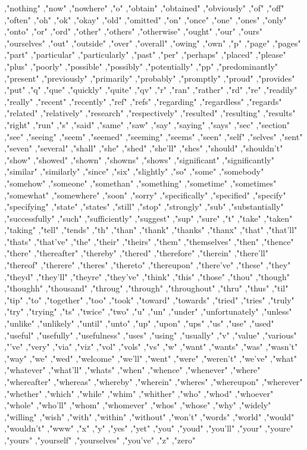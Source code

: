 ,"nothing" ,"now" ,"nowhere" ,"o" ,"obtain" ,"obtained" ,"obviously" ,"of" ,"off" ,"often" ,"oh" ,"ok" ,"okay" ,"old" ,"omitted" ,"on" ,"once" ,"one" ,"ones" ,"only" ,"onto" ,"or" ,"ord" ,"other" ,"others" ,"otherwise" ,"ought" ,"our" ,"ours" ,"ourselves" ,"out" ,"outside" ,"over" ,"overall" ,"owing" ,"own" ,"p" ,"page" ,"pages" ,"part" ,"particular" ,"particularly" ,"past" ,"per" ,"perhaps" ,"placed" ,"please" ,"plus" ,"poorly" ,"possible" ,"possibly" ,"potentially" ,"pp" ,"predominantly" ,"present" ,"previously" ,"primarily" ,"probably" ,"promptly" ,"proud" ,"provides" ,"put" ,"q" ,"que" ,"quickly" ,"quite" ,"qv" ,"r" ,"ran" ,"rather" ,"rd" ,"re" ,"readily" ,"really" ,"recent" ,"recently" ,"ref" ,"refs" ,"regarding" ,"regardless" ,"regards" ,"related" ,"relatively" ,"research" ,"respectively" ,"resulted" ,"resulting" ,"results" ,"right" ,"run" ,"s" ,"said" ,"same" ,"saw" ,"say" ,"saying" ,"says" ,"sec" ,"section" ,"see" ,"seeing" ,"seem" ,"seemed" ,"seeming" ,"seems" ,"seen" ,"self" ,"selves" ,"sent" ,"seven" ,"several" ,"shall" ,"she" ,"shed" ,"she'll" ,"shes" ,"should" ,"shouldn't" ,"show" ,"showed" ,"shown" ,"showns" ,"shows" ,"significant" ,"significantly" ,"similar" ,"similarly" ,"since" ,"six" ,"slightly" ,"so" ,"some" ,"somebody" ,"somehow" ,"someone" ,"somethan" ,"something" ,"sometime" ,"sometimes" ,"somewhat" ,"somewhere" ,"soon" ,"sorry" ,"specifically" ,"specified" ,"specify" ,"specifying" ,"state" ,"states" ,"still" ,"stop" ,"strongly" ,"sub" ,"substantially" ,"successfully" ,"such" ,"sufficiently" ,"suggest" ,"sup" ,"sure" ,"t" ,"take" ,"taken" ,"taking" ,"tell" ,"tends" ,"th" ,"than" ,"thank" ,"thanks" ,"thanx" ,"that" ,"that'll" ,"thats" ,"that've" ,"the" ,"their" ,"theirs" ,"them" ,"themselves" ,"then" ,"thence" ,"there" ,"thereafter" ,"thereby" ,"thered" ,"therefore" ,"therein" ,"there'll" ,"thereof" ,"therere" ,"theres" ,"thereto" ,"thereupon" ,"there've" ,"these" ,"they" ,"theyd" ,"they'll" ,"theyre" ,"they've" ,"think" ,"this" ,"those" ,"thou" ,"though" ,"thoughh" ,"thousand" ,"throug" ,"through" ,"throughout" ,"thru" ,"thus" ,"til" ,"tip" ,"to" ,"together" ,"too" ,"took" ,"toward" ,"towards" ,"tried" ,"tries" ,"truly" ,"try" ,"trying" ,"ts" ,"twice" ,"two" ,"u" ,"un" ,"under" ,"unfortunately" ,"unless" ,"unlike" ,"unlikely" ,"until" ,"unto" ,"up" ,"upon" ,"ups" ,"us" ,"use" ,"used" ,"useful" ,"usefully" ,"usefulness" ,"uses" ,"using" ,"usually" ,"v" ,"value" ,"various" ,"'ve" ,"very" ,"via" ,"viz" ,"vol" ,"vols" ,"vs" ,"w" ,"want" ,"wants" ,"was" ,"wasn't" ,"way" ,"we" ,"wed" ,"welcome" ,"we'll" ,"went" ,"were" ,"weren't" ,"we've" ,"what" ,"whatever" ,"what'll" ,"whats" ,"when" ,"whence" ,"whenever" ,"where" ,"whereafter" ,"whereas" ,"whereby" ,"wherein" ,"wheres" ,"whereupon" ,"wherever" ,"whether" ,"which" ,"while" ,"whim" ,"whither" ,"who" ,"whod" ,"whoever" ,"whole" ,"who'll" ,"whom" ,"whomever" ,"whos" ,"whose" ,"why" ,"widely" ,"willing" ,"wish" ,"with" ,"within" ,"without" ,"won't" ,"words" ,"world" ,"would" ,"wouldn't" ,"www" ,"x" ,"y" ,"yes" ,"yet" ,"you" ,"youd" ,"you'll" ,"your" ,"youre" ,"yours" ,"yourself" ,"yourselves" ,"you've" ,"z" ,"zero"

